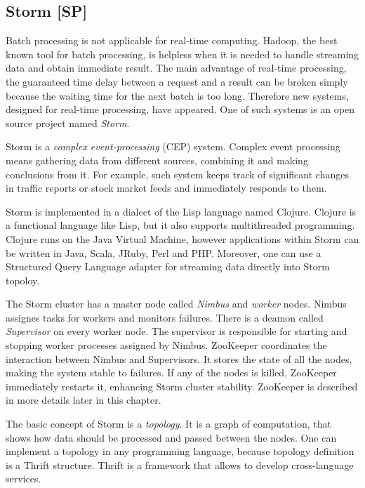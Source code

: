 \subsection{Storm [SP]}
\label{subs:storm}

Batch processing is not applicable for real-time computing.
Hadoop, the best known tool for batch processing, is helpless when it is needed to handle streaming data and obtain immediate result.
The main advantage of real-time processing, the guaranteed time delay between a request and a result can be broken simply because the waiting time for the next batch is too long.
Therefore new systems, designed for real-time processing, have appeared.
One of such systems is an open source project named \textit{Storm}.

Storm is a \textit{complex event-processing} (CEP) system.
Complex event processing means gathering data from different sources, combining it and making conclusions from it.
For example, such system keeps track of significant changes in traffic reports or stock market feeds and immediately responds to them. 

Storm is implemented in a dialect of the Lisp language named Clojure.
Clojure is a functional language like Lisp, but it also supports multithreaded programming.
Clojure runs on the Java Virtual Machine, however applications within Storm can be written in Java, Scala, JRuby, Perl and PHP.
Moreover, one can use a Structured Query Language adapter for streaming data directly into Storm topoloy.

The Storm cluster has a master node called \textit{Nimbus} and \textit{worker} nodes.
Nimbus assignes tasks for workers and monitors failures.
There is a deamon called \textit{Supervisor} on every worker node.
The supervisor is responsible for starting and stopping worker processes assigned by Nimbus.
ZooKeeper coordinates the interaction between Nimbus and Supervisors.
It stores the state of all the nodes, making the system stable to failures.
If any of the nodes is killed, ZooKeeper immediately restarts it, enhancing Storm cluster stability.
ZooKeeper is described in more details later in this chapter.

The basic concept of Storm is a \textit{topology}.
It is a graph of computation, that shows how data should be processed and passed between the nodes.
One can implement a topology in any programming language, because topology definition is a Thrift structure.
Thrift is a framework that allows to develop cross-language services.	

